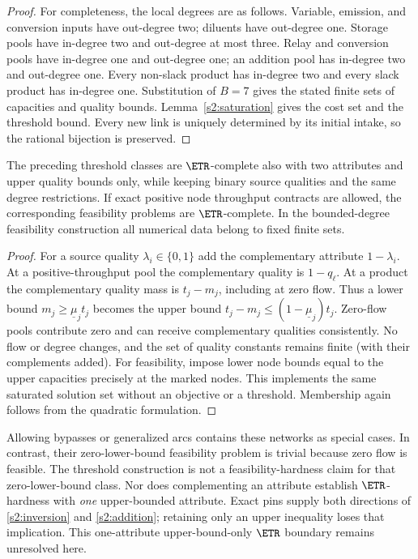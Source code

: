 \begin{proof}
For completeness, the local degrees are as follows. Variable, emission,
and conversion inputs have out-degree two; diluents have out-degree
one. Storage pools have in-degree two and out-degree at most three.
Relay and conversion pools have in-degree one and out-degree one;
an addition pool has in-degree two and out-degree one. Every non-slack
product has in-degree two and every slack product has in-degree one.
Substitution of $B=7$ gives the stated finite sets of capacities and
quality bounds. Lemma~\ref{s2:saturation} gives the cost set and the
threshold bound. Every new link is uniquely determined by its initial
intake, so the rational bijection is preserved.
\end{proof}

\begin{corollary}\label{s2:variants}
The preceding threshold classes are $\ETR$-complete also with two
attributes and upper quality bounds only, while keeping binary source
qualities and the same degree restrictions. If exact positive node
throughput contracts are allowed, the corresponding feasibility problems
are $\ETR$-complete. In the bounded-degree feasibility construction all
numerical data belong to fixed finite sets.
\end{corollary}
\begin{proof}
For a source quality $\lambda_i\in\{0,1\}$ add the complementary
attribute $1-\lambda_i$. At a positive-throughput pool the complementary
quality is $1-q_\ell$. At a product the complementary quality mass is
$t_j-m_j$, including at zero flow. Thus a lower bound
$m_j\ge\underline\mu_jt_j$ becomes the upper bound
$t_j-m_j\le(1-\underline\mu_j)t_j$. Zero-flow pools contribute zero
and can receive complementary qualities consistently. No flow or degree
changes, and the set of quality constants remains finite (with their
complements added). For feasibility, impose lower node bounds equal
to the upper capacities precisely at the marked nodes. This implements
the same saturated solution set without an objective or a threshold.
Membership again follows from the quadratic formulation.
\end{proof}

Allowing bypasses or generalized arcs contains these networks as special
cases. In contrast, their zero-lower-bound feasibility problem is trivial
because zero flow is feasible. The threshold construction is not a
feasibility-hardness claim for that zero-lower-bound class. Nor does
complementing an attribute establish $\ETR$-hardness with \emph{one}
upper-bounded attribute. Exact pins supply both directions of
\eqref{s2:inversion} and \eqref{s2:addition}; retaining only an upper
inequality loses that implication. This one-attribute upper-bound-only
$\ETR$ boundary remains unresolved here.

